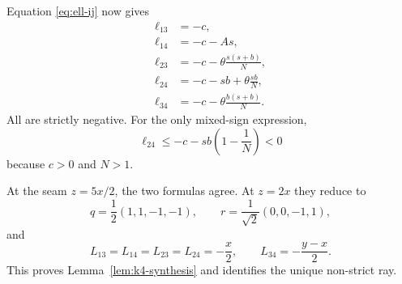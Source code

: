 \documentclass[11pt,reqno]{amsart}
\theoremstyle{definition}
\theoremstyle{remark}
\begin{document}
Equation \eqref{eq:ell-ij} now gives
\begin{align*}
  \ell_{13}&=-c,\\
  \ell_{14}&=-c-As,\\
  \ell_{23}&=-c-\theta\frac{s(s+b)}N,\\
  \ell_{24}&=-c-sb+\theta\frac{sb}{N},\\
  \ell_{34}&=-c-\theta\frac{b(s+b)}N.
\end{align*}
All are strictly negative.  For the only mixed-sign expression,
\[
  \ell_{24}\le-c-sb\left(1-\frac1N\right)<0
\]
because $c>0$ and $N>1$.

At the seam $z=5x/2$, the two formulas agree.  At $z=2x$ they reduce to
\[
  q=\frac12(1,1,-1,-1),\qquad
  r=\frac1{\sqrt2}(0,0,-1,1),
\]
and
\[
  L_{13}=L_{14}=L_{23}=L_{24}=-\frac x2,
  \qquad L_{34}=-\frac{y-x}{2}.
\]
This proves Lemma~\ref{lem:k4-synthesis} and identifies the unique non-strict
ray.
\end{document}
